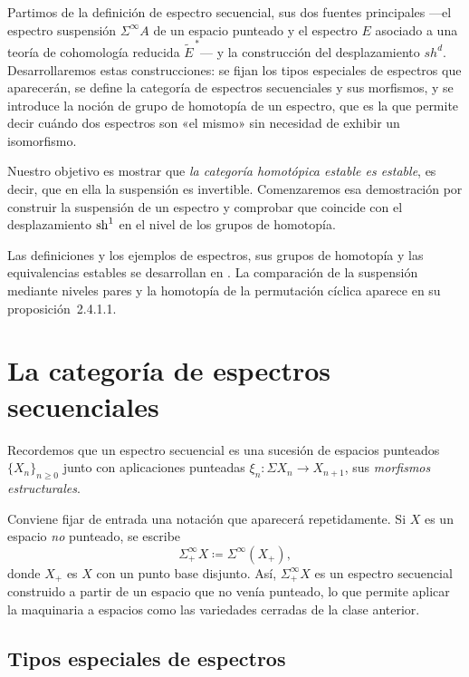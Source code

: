 Partimos de la definición de espectro secuencial, sus dos fuentes principales ---el espectro suspensión $\Sigma^\infty A$ de un espacio punteado y el espectro $E$ asociado a una teoría de cohomología reducida $\widetilde E^{\,*}$--- y la construcción del desplazamiento $sh^d$. Desarrollaremos estas construcciones: se fijan los tipos especiales de espectros que aparecerán, se define la categoría de espectros secuenciales y sus morfismos, y se introduce la noción de grupo de homotopía de un espectro, que es la que permite decir cuándo dos espectros son «el mismo» sin necesidad de exhibir un isomorfismo.

Nuestro objetivo es mostrar que \emph{la categoría homotópica estable es estable}, es decir, que en ella la suspensión es invertible. Comenzaremos esa demostración por construir la suspensión de un espectro y comprobar que coincide con el desplazamiento $\operatorname{sh}^1$ en el nivel de los grupos de homotopía.

Las definiciones y los ejemplos de espectros, sus grupos de homotopía y las equivalencias estables se desarrollan en \cite[\S\S2.1--2.2]{malkiewich}. La comparación de la suspensión mediante niveles pares y la homotopía de la permutación cíclica aparece en su proposición~2.4.1.1.

\section{La categoría de espectros secuenciales}

Recordemos que un espectro secuencial es una sucesión de espacios punteados $\{X_n\}_{n\ge0}$ junto con aplicaciones punteadas $\xi_n\colon\Sigma X_n\to X_{n+1}$, sus \emph{morfismos estructurales}.

Conviene fijar de entrada una notación que aparecerá repetidamente. Si $X$ es un espacio \emph{no} punteado, se escribe
\[
\Sigma^\infty_+X\coloneqq\Sigma^\infty(X_+),
\]
donde $X_+$ es $X$ con un punto base disjunto. Así, $\Sigma^\infty_+X$ es un espectro secuencial construido a partir de un espacio que no venía punteado, lo que permite aplicar la maquinaria a espacios como las variedades cerradas de la clase anterior.

\subsection{Tipos especiales de espectros}

